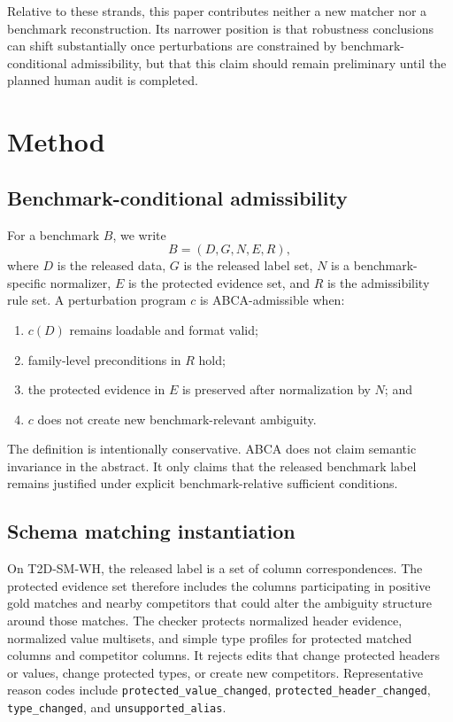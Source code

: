 \documentclass{article}
\newcommand{\abca}{\textsc{ABCA}}
\begin{document}
Relative to these strands, this paper contributes neither a new matcher nor a benchmark reconstruction. Its narrower position is that robustness conclusions can shift substantially once perturbations are constrained by benchmark-conditional admissibility, but that this claim should remain preliminary until the planned human audit is completed.

\section{Method}
\label{sec:method}
\subsection{Benchmark-conditional admissibility}
For a benchmark $B$, we write
\[
B = (D, G, N, E, R),
\]
where $D$ is the released data, $G$ is the released label set, $N$ is a benchmark-specific normalizer, $E$ is the protected evidence set, and $R$ is the admissibility rule set. A perturbation program $c$ is \abca-admissible when:
\begin{enumerate}
  \item $c(D)$ remains loadable and format valid;
  \item family-level preconditions in $R$ hold;
  \item the protected evidence in $E$ is preserved after normalization by $N$; and
  \item $c$ does not create new benchmark-relevant ambiguity.
\end{enumerate}

The definition is intentionally conservative. \abca{} does not claim semantic invariance in the abstract. It only claims that the released benchmark label remains justified under explicit benchmark-relative sufficient conditions.

\subsection{Schema matching instantiation}
On T2D-SM-WH, the released label is a set of column correspondences. The protected evidence set therefore includes the columns participating in positive gold matches and nearby competitors that could alter the ambiguity structure around those matches. The checker protects normalized header evidence, normalized value multisets, and simple type profiles for protected matched columns and competitor columns. It rejects edits that change protected headers or values, change protected types, or create new competitors. Representative reason codes include \texttt{protected\_value\_changed}, \texttt{protected\_header\_changed}, \texttt{type\_changed}, and \texttt{unsupported\_alias}.
\end{document}
